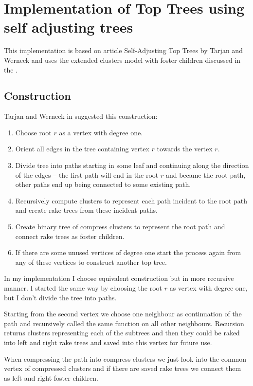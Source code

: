 \chapter{Implementation of Top Trees using self adjusting trees}
\label{chap:ImplementationSelfAdjusting}

This implementation is based on article Self-Adjusting Top Trees
\cite{SelfAdjustingTT} by Tarjan and Werneck and uses the extended clusters
model with foster children discussed in the .

\section{Construction}

Tarjan and Werneck in \cite{SelfAdjustingTT} suggested this construction:
\begin{enumerate}
\item Choose root $r$ as a vertex with degree one.
\item Orient all edges in the tree containing vertex $r$ towards the vertex $r$.
\item Divide tree into paths starting in some leaf and continuing along the
direction of the edges -- the first path will end in the root $r$ and became the
{\I root path}, other paths end up being connected to some existing path.
\item Recursively compute clusters to represent each path incident to the
root path and create {\I rake trees} from these incident paths.
\item Create binary tree of compress clusters to represent the root path and
connect rake trees as foster children.
\item If there are some unused vertices of degree one start the process again
from any of these vertices to construct another top tree.
\end{enumerate}

In my implementation I choose equivalent construction but in more recursive
manner. I started the same way by choosing the root $r$ as vertex with degree
one, but I don't divide the tree into paths.

Starting from the second vertex we choose one neighbour as continuation of the
path and recursively called the same function on all other neighbours. Recursion
returns clusters representing each of the subtrees and then they could be
raked into left and right rake trees and saved into this vertex for future use.

When compressing the path into compress clusters we just look into the common
vertex of compressed clusters and if there are saved rake trees we connect them
as left and right foster children.

